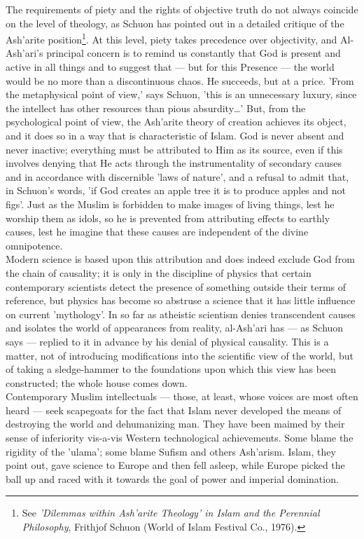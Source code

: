 \documentclass[11pt, b5paper, twoside]{book}
\begin{document}
The requirements of piety and the rights of objective truth do not always coincide on the level of 
theology, as Schuon has pointed out in a detailed critique of the Ash'arite position\footnote{See \emph{'Dilemmas within Ash'arite Theology' in Islam and the Perennial Philosophy}, Frithjof Schuon 
(World of Islam Festival Co., 1976).}. At this 
level, piety takes precedence over objectivity, and Al-Ash'ari's principal concern is to remind us 
constantly that God is present and active in all things and to suggest that --- but for this Presence --- 
the world would be no more than a discontinuous chaos. He succeeds, but at a price. 'From the 
metaphysical point of view,' says Schuon, 'this is an unnecessary luxury, since the intellect has 
other resources than pious absurdity\ldots{}' But, from the psychological point of view, the Ash'arite 
theory of creation achieves its object, and it does so in a way that is characteristic of Islam. God 
is never absent and never inactive; everything must be attributed to Him as its source, even if this 
involves denying that He acts through the instrumentality of secondary causes and in accordance with 
discernible 'laws of nature', and a refusal to admit that, in Schuon's words, 'if God creates an 
apple tree it is to produce apples and not figs'. Just as the Muslim is forbidden to make images of 
living things, lest he worship them as idols, so he is prevented from attributing effects to earthly 
causes, lest he imagine that these causes are independent of the divine omnipotence. \\

Modern science is based upon this attribution and does indeed exclude God from the chain of 
causality; it is only in the discipline of physics that certain contemporary scientists detect the 
presence of something outside their terms of reference, but physics has become so abstruse a science 
that it has little influence on current 'mythology'. In so far as atheistic scientism denies 
transcendent causes and isolates the world of appearances from reality, al-Ash'ari has --- as Schuon 
says --- replied to it in advance by his denial of physical causality. This is a matter, not of 
introducing modifications into the scientific view of the world, but of taking a sledge-hammer to the 
foundations upon which this view has been constructed; the whole house comes down. \\

Contemporary Muslim intellectuals --- those, at least, whose voices are most often heard --- seek 
scapegoats for the fact that Islam never developed the means of destroying the world and dehumanizing 
man. They have been maimed by their sense of inferiority vis-a-vis Western technological 
achievements. Some blame the rigidity of the 'ulama'; some blame Sufism and others Ash'arism. Islam, 
they point out, gave science to Europe and then fell asleep, while Europe picked the ball up and 
raced with it towards the goal of power and imperial domination. \\
\end{document}
